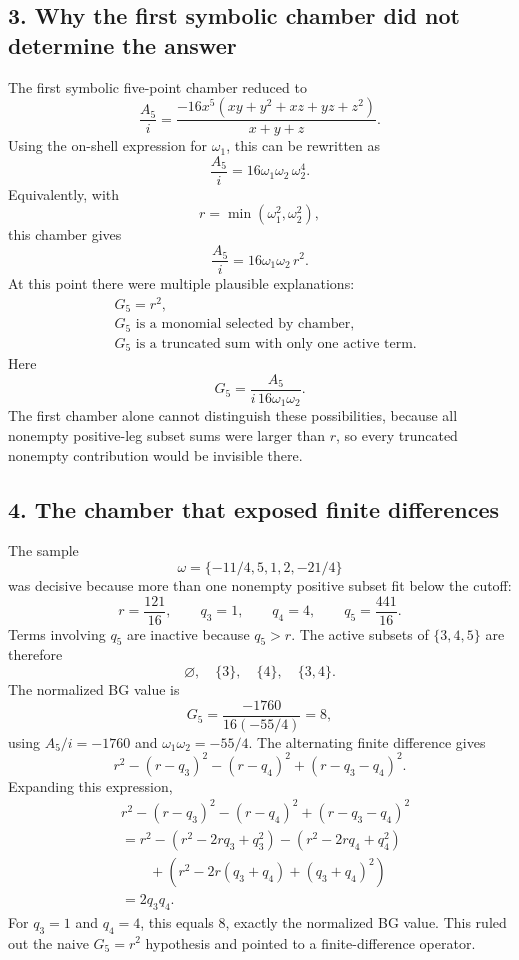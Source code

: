 \documentclass[11pt]{article}
\begin{document}
\subsection*{3. Why the first symbolic chamber did not determine the answer}

The first symbolic five-point chamber reduced to
\[
    \frac{A_5}{i}
    =
    \frac{-16x^5(xy+y^2+xz+yz+z^2)}{x+y+z}.
\]
Using the on-shell expression for \(\omega_1\), this can be rewritten as
\[
    \frac{A_5}{i}=16\omega_1\omega_2\,\omega_2^4.
\]
Equivalently, with
\[
    r=\min(\omega_1^2,\omega_2^2),
\]
this chamber gives
\[
    \frac{A_5}{i}=16\omega_1\omega_2\,r^2.
\]
At this point there were multiple plausible explanations:
\[
\begin{aligned}
    &G_5=r^2,\\
    &G_5\text{ is a monomial selected by chamber},\\
    &G_5\text{ is a truncated sum with only one active term}.
\end{aligned}
\]
Here
\[
    G_5=\frac{A_5}{i\,16\omega_1\omega_2}.
\]
The first chamber alone cannot distinguish these possibilities, because all
nonempty positive-leg subset sums were larger than \(r\), so every truncated
nonempty contribution would be invisible there.

\subsection*{4. The chamber that exposed finite differences}

The sample
\[
    \omega=\{-11/4,5,1,2,-21/4\}
\]
was decisive because more than one nonempty positive subset fit below the
cutoff:
\[
    r=\frac{121}{16},\qquad
    q_3=1,\qquad
    q_4=4,\qquad
    q_5=\frac{441}{16}.
\]
Terms involving \(q_5\) are inactive because \(q_5>r\). The active subsets of
\(\{3,4,5\}\) are therefore
\[
    \varnothing,\quad \{3\},\quad \{4\},\quad \{3,4\}.
\]
The normalized BG value is
\[
    G_5=\frac{-1760}{16(-55/4)}=8,
\]
using \(A_5/i=-1760\) and \(\omega_1\omega_2=-55/4\). The alternating finite
difference gives
\[
    r^2-(r-q_3)^2-(r-q_4)^2+(r-q_3-q_4)^2.
\]
Expanding this expression,
\[
\begin{aligned}
&r^2-(r-q_3)^2-(r-q_4)^2+(r-q_3-q_4)^2\\
&=r^2-(r^2-2rq_3+q_3^2)-(r^2-2rq_4+q_4^2)\\
&\qquad +(r^2-2r(q_3+q_4)+(q_3+q_4)^2)\\
&=2q_3q_4.
\end{aligned}
\]
For \(q_3=1\) and \(q_4=4\), this equals \(8\), exactly the normalized BG
value. This ruled out the naive \(G_5=r^2\) hypothesis and pointed to a
finite-difference operator.
\end{document}
